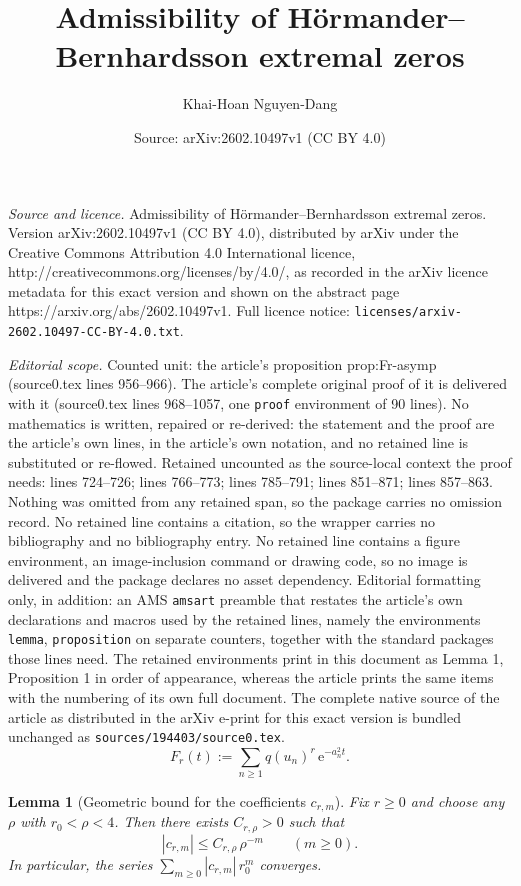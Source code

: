 \documentclass[10pt,a4paper]{amsart}
\title{Admissibility of H\"ormander--Bernhardsson extremal zeros}
\author{Khai-Hoan Nguyen-Dang}
\date{Source: arXiv:2602.10497v1 (CC BY 4.0)}
\newtheorem{lemma}{Lemma}
\newcommand{\e}{\mathrm{e}}
\begin{document}
\maketitle

\noindent\emph{Source and licence.} Admissibility of H\"ormander--Bernhardsson extremal zeros. Version arXiv:2602.10497v1 (CC BY 4.0), distributed by arXiv under the Creative Commons Attribution 4.0 International licence, http://creativecommons.org/licenses/by/4.0/, as recorded in the arXiv licence metadata for this exact version and shown on the abstract page https://arxiv.org/abs/2602.10497v1. Full licence notice: \texttt{licenses/arxiv-2602.10497-CC-BY-4.0.txt}.\par\smallskip

\noindent\textit{Editorial scope.} Counted unit: the article's proposition prop:Fr-asymp (source0.tex lines 956--966). The article's complete original proof of it is delivered with it (source0.tex lines 968--1057, one \texttt{proof} environment of 90 lines). No mathematics is written, repaired or re-derived: the statement and the proof are the article's own lines, in the article's own notation, and no retained line is substituted or re-flowed.  Retained uncounted as the source-local context the proof needs: lines 724--726; lines 766--773; lines 785--791; lines 851--871; lines 857--863.  Nothing was omitted from any retained span, so the package carries no omission record.  No retained line contains a citation, so the wrapper carries no bibliography and no bibliography entry.  No retained line contains a figure environment, an image-inclusion command or drawing code, so no image is delivered and the package declares no asset dependency.  Editorial formatting only, in addition: an AMS \texttt{amsart} preamble that restates the article's own declarations and macros used by the retained lines, namely the environments \texttt{lemma}, \texttt{proposition} on separate counters, together with the standard packages those lines need.  The retained environments print in this document as Lemma 1, Proposition 1 in order of appearance, whereas the article prints the same items with the numbering of its own full document.  The complete native source of the article as distributed in the arXiv e-print for this exact version is bundled unchanged as \texttt{sources/194403/source0.tex}.
\begin{equation}\label{eq:def-Fr}
F_r(t):=\sum_{n\ge 1}q(u_n)^r\,\e^{-a_n^2 t}.
\end{equation}

\begin{lemma}[Geometric bound for the coefficients $c_{r,m}$]\label{lem:crm-bound}
Fix $r\ge 0$ and choose any $\rho$ with $r_0<\rho<4$. Then there exists $C_{r,\rho}>0$
such that
\begin{equation}\label{eq:crm-bound}
|c_{r,m}|\le C_{r,\rho}\,\rho^{-m}\qquad(m\ge 0).
\end{equation}
In particular, the series $\sum_{m\ge 0}|c_{r,m}|\,r_0^m$ converges.
\end{lemma}
\end{document}
